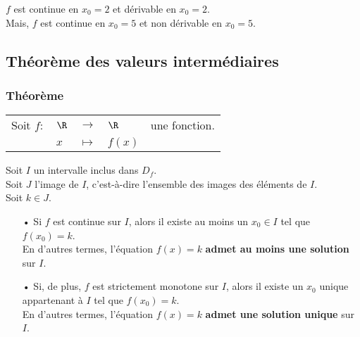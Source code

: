 \vspace*{.3cm}

$f$ est continue en $x_0 = 2$ et dérivable en $x_0 = 2$. \\

Mais, $f$ est continue en $x_0 = 5$ et non dérivable en $x_0 = 5$. 

\vspace*{-5cm}

\newpage

\vspace*{-2cm}

\subsection{Théorème des valeurs intermédiaires}

\subsubsection{Théorème}

\begin{tabular}{lllll}
\hspace{-.3cm} Soit $f:$ & $\R$ & $\longrightarrow$ & $\R$ & une fonction. \\
& $x$ & $\longmapsto$ & $f(x)$ & \\
\end{tabular}

\vspace*{.3cm}

Soit $I$ un intervalle inclus dans $D_f$. \\
Soit $J$ l'image de $I$, c'est-à-dire l'ensemble des images des éléments de $I$. \\
Soit $k \in J$. \\

\begin{itemize}
\item[•] Si $f$ est continue sur $I$, alors il existe au moins un $x_0 \in I$ tel que $f(x_0) = k$. \\

En d'autres termes, l'équation $f(x) = k$ \textbf{admet au moins une solution} sur $I$. \\

\item[•] Si, de plus, $f$ est strictement monotone sur $I$, alors il existe un $x_0$ unique appartenant à $I$ tel que $f(x_0) = k$. \\

En d'autres termes, l'équation $f(x) = k$ \textbf{admet une solution unique} sur $I$. \\ 
\end{itemize}

